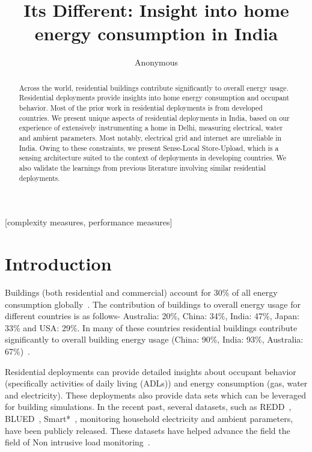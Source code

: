 \documentclass[10pt]{sensys-proc}
\author{
%
\alignauthor Anonymous \\
       \email{xyz@zyz.edu}
}
\title{Its Different: Insight into home energy consumption in India}
\newcommand{\paradigm}{Sense-Local Store-Upload}
\begin{document}
\maketitle

\begin{abstract}
Across the world, residential buildings contribute significantly to overall energy usage. Residential deployments provide insights into home energy consumption and occupant behavior. Most of the prior work in residential deployments is from developed countries. We present unique aspects of residential deployments in India, based on our experience of extensively instrumenting a home in Delhi, measuring electrical, water and ambient parameters. Most notably, electrical grid and internet are unreliable in India. Owing to these constraints, we present \paradigm, which is a sensing architecture suited to the context of deployments in developing countries. We also validate the learnings from previous literature involving similar residential deployments.
\end{abstract}

[complexity measures, performance measures]



\section{Introduction}
  \label{sec:intro}
Buildings (both residential and commercial) account for 30\% of all energy consumption globally~\cite{evans09india}. The contribution of buildings to overall energy usage for different countries is as follows- Australia: 20\%, China: 34\%, India: 47\%, Japan: 33\% and USA: 29\%. In many of these countries residential buildings contribute significantly to overall building energy usage (China: 90\%, India: 93\%, Australia: 67\%)~\cite{evans09aus,evans09us,evans09japan,evans09india,evans09china}.

Residential deployments can provide detailed insights about occupant behavior (specifically activities of daily living (ADLs)) and energy consumption (gas, water and electricity). These deployments also provide data sets which can be leveraged for building simulations. In the recent past, several datasets, such as REDD~\cite{redd}, BLUED~\cite{blued_cmu}, Smart*~\cite{smart}, monitoring household electricity and ambient parameters, have been publicly released. These datasets have helped advance the field the field of Non intrusive load monitoring~\cite{hart}.
\end{document}
